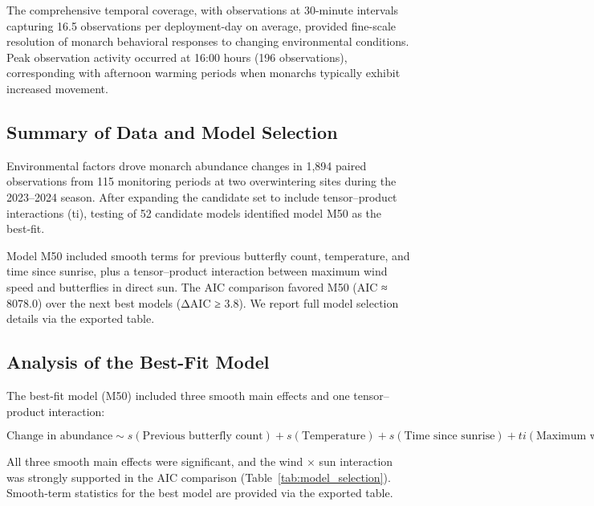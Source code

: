 The comprehensive temporal coverage, with observations at 30-minute intervals capturing 16.5 observations per deployment-day on average, provided fine-scale resolution of monarch behavioral responses to changing environmental conditions. Peak observation activity occurred at 16:00 hours (196 observations), corresponding with afternoon warming periods when monarchs typically exhibit increased movement.

\subsection{Summary of Data and Model Selection}

Environmental factors drove monarch abundance changes in 1,894 paired observations from 115 monitoring periods at two overwintering sites during the 2023–2024 season. After expanding the candidate set to include tensor–product interactions (ti), testing of 52 candidate models identified model M50 as the best‑fit.

Model M50 included smooth terms for previous butterfly count, temperature, and time since sunrise, plus a tensor–product interaction between maximum wind speed and butterflies in direct sun. The AIC comparison favored M50 (AIC ≈ 8078.0) over the next best models (ΔAIC ≥ 3.8). We report full model selection details via the exported table.

\begin{table}[htbp]
\centering
\caption{Top five candidate models ranked by AIC for the 30‑minute analysis.}
\label{tab:model_selection}

\end{table}

\subsection{Analysis of the Best-Fit Model}

The best‑fit model (M50) included three smooth main effects and one tensor–product interaction:

\begin{equation}
\text{Change in abundance} \sim s(\text{Previous butterfly count}) + s(\text{Temperature}) + s(\text{Time since sunrise}) + ti(\text{Maximum wind speed},\, \text{Butterflies in direct sun}).
\end{equation}

All three smooth main effects were significant, and the wind × sun interaction was strongly supported in the AIC comparison (Table~\ref{tab:model_selection}). Smooth‑term statistics for the best model are provided via the exported table.

